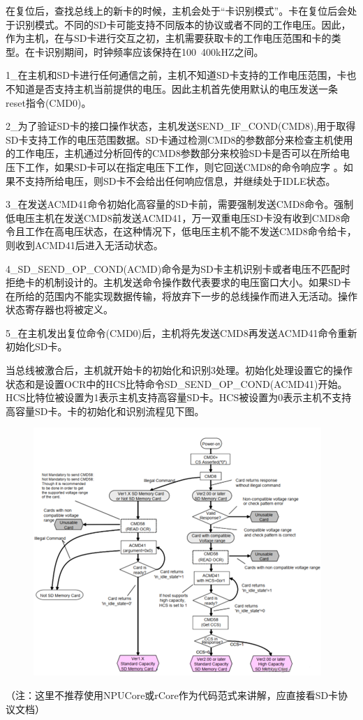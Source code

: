 在复位后，查找总线上的新卡的时候，主机会处于“卡识别模式”。卡在复位后会处于识别模式。不同的SD卡可能⽀持不同版本的协议或者不同的⼯作电压。因此，作为主机，在与SD卡进⾏交互之初，主机需要获取卡的⼯作电压范围和卡的类型。在卡识别期间，时钟频率应该保持在100~400kHZ之间。

1_在主机和SD卡进行任何通信之前，主机不知道SD卡支持的工作电压范围，卡也不知道是否支持主机当前提供的电压。因此主机首先使用默认的电压发送一条reset指令(CMD0)。

2_为了验证SD卡的接口操作状态，主机发送SEND_IF_COND(CMD8),用于取得SD卡支持工作的电压范围数据。SD卡通过检测CMD8的参数部分来检查主机使用的工作电压，主机通过分析回传的CMD8参数部分来校验SD卡是否可以在所给电压下工作，如果SD卡可以在指定电压下工作，则它回送CMD8的命令响应字 。如果不支持所给电压，则SD卡不会给出任何响应信息，并继续处于IDLE状态。

3_在发送ACMD41命令初始化高容量的SD卡前，需要强制发送CMD8命令。强制低电压主机在发送CMD8前发送ACMD41，万一双重电压SD卡没有收到CMD8命令且工作在高电压状态，在这种情况下，低电压主机不能不发送CMD8命令给卡，则收到ACMD41后进入无活动状态。

4_SD_SEND_OP_COND(ACMD)命令是为SD卡主机识别卡或者电压不匹配时拒绝卡的机制设计的。主机发送命令操作数代表要求的电压窗口大小。如果SD卡在所给的范围内不能实现数据传输，将放弃下一步的总线操作而进入无活动。操作状态寄存器也将被定义。

5_在主机发出复位命令(CMD0)后，主机将先发送CMD8再发送ACMD41命令重新初始化SD卡。

当总线被激合后，主机就开始卡的初始化和识别3处理。初始化处理设置它的操作状态和是设置OCR中的HCS比特命令SD_SEND_OP_COND(ACMD41)开始。HCS比特位被设置为1表示主机支持高容量SD卡。HCS被设置为0表示主机不支持高容量SD卡。卡的初始化和识别流程见下图。
\begin{figure}[H]
    \centering
    \includegraphics{figures/06-02-初始化.png}
\end{figure}
（注：这里不推荐使用NPUCore或rCore作为代码范式来讲解，应直接看SD卡协议文档）

